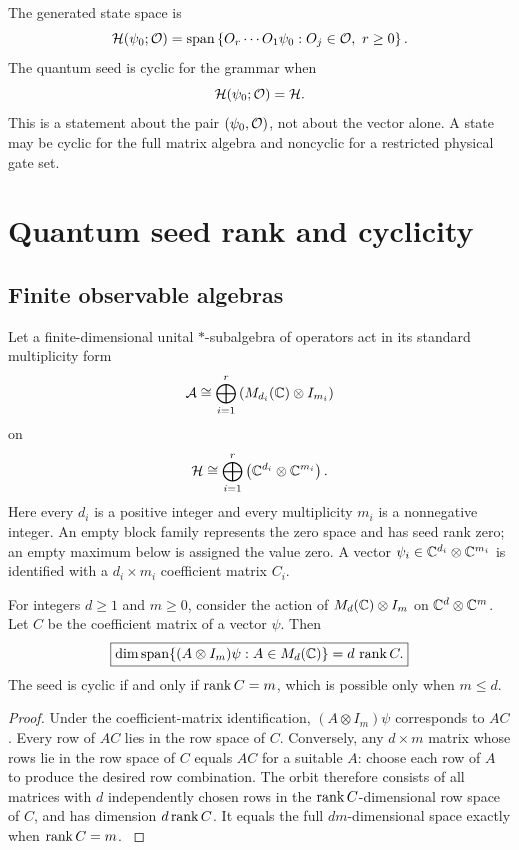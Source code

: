 The generated state space is
\[
\cH(\psi_0;\cO)
=
\operatorname{span}
\left\{
O_r\cdots O_1\psi_0:
O_j\in\cO,
\ r\ge0
\right\}.
\]
The quantum seed is cyclic for the grammar when
\[
\cH(\psi_0;\cO)=\cH.
\]
This is a statement about the pair $(\psi_0,\cO)$, not about the vector alone. A state may be cyclic for the full matrix algebra and noncyclic for a restricted physical gate set.

\section{Quantum seed rank and cyclicity}\label{core:section:002}

\subsection{Finite observable algebras}

Let a finite-dimensional unital $*$-subalgebra of operators act in its standard multiplicity form
\[
\cA
\cong
\bigoplus_{i=1}^r
\left(M_{d_i}(\bbC)\otimes I_{m_i}\right)
\]
on
\[
\cH
\cong
\bigoplus_{i=1}^r
\left(\bbC^{d_i}\otimes\bbC^{m_i}\right).
\]
Here every $d_i$ is a positive integer and every multiplicity $m_i$ is a nonnegative integer. An empty block family represents the zero space and has seed rank zero; an empty maximum below is assigned the value zero. A vector $\psi_i\in\bbC^{d_i}\otimes\bbC^{m_i}$ is identified with a $d_i\times m_i$ coefficient matrix $C_i$.

\begin{theorem}\label{core:theorem:001}\label{core:thm:seed-orbit}
For integers $d\ge1$ and $m\ge0$, consider the action of $M_d(\bbC)\otimes I_m$ on $\bbC^d\otimes\bbC^m$. Let $C$ be the coefficient matrix of a vector $\psi$. Then
\[
\boxed{
\dim\operatorname{span}\{(A\otimes I_m)\psi:A\in M_d(\bbC)\}
=d\,\rank C.
}
\]
The seed is cyclic if and only if $\operatorname{rank} C=m$, which is possible only when $m\le d$.
\end{theorem}

\begin{proof}\label{core:proof:001}
Under the coefficient-matrix identification, $(A\otimes I_m)\psi$ corresponds to $AC$. Every row of $AC$ lies in the row space of $C$. Conversely, any $d\times m$ matrix whose rows lie in the row space of $C$ equals $AC$ for a suitable $A$: choose each row of $A$ to produce the desired row combination. The orbit therefore consists of all matrices with $d$ independently chosen rows in the $\operatorname{rank} C$-dimensional row space of $C$, and has dimension $d\operatorname{rank} C$. It equals the full $dm$-dimensional space exactly when $\operatorname{rank} C=m$.
\label{core:proof:001:end}\end{proof}

